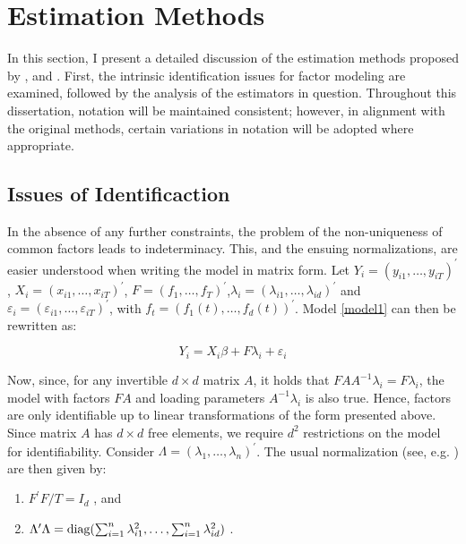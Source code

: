 \section{Estimation Methods}\label{estimation}

In this section, I present a detailed discussion of the estimation methods proposed by \citet{kneip2012new}, \citet{bai2009panel} and \citet{bada2014parameter}. First, the intrinsic identification issues for factor modeling are examined, followed by the analysis of the estimators in question. Throughout this dissertation, notation will be maintained consistent; however, in alignment with the original methods, certain variations in notation will be adopted where appropriate.

\subsection{Issues of Identificaction}\label{identification}

In the absence of any further constraints, the problem of the non-uniqueness of common factors leads to indeterminacy. This, and the ensuing normalizations, are easier understood when writing the model in matrix form. Let $Y_i = (y_{i1}, \ldots, y_{iT})^\prime$, $X_i = (x_{i1}, \ldots, x_{iT})^{\prime}$, $F = (f_1,  \ldots, f_T)^\prime$,$ \lambda_i = (\lambda_{i 1}, \ldots, \lambda_{i d})^{\prime}$ and $\varepsilon_{i} = (\varepsilon_{i1}, \ldots, \varepsilon_{iT})^\prime$, with  $f_t = (f_1(t), \ldots, f_d(t))^\prime$. Model \cref{model1} can then be rewritten as:

\begin{equation}\label{matrix_notation}
    Y_i=X_i \beta+ F\lambda_i +\varepsilon_i
\end{equation}

 

Now, since, for any invertible  $d \times d$ matrix $A$, it holds that $ F A A^{-1} \lambda_i =  F \lambda_i$, the model with factors $FA$ and loading parameters $A^{-1}\lambda_i $ is also true. Hence, factors are only identifiable up to linear transformations of the form presented above. Since matrix $A$ has $d \times d$ free elements, we require $d^2$ restrictions on the model for identifiability. Consider $\Lambda = (\lambda_1, \ldots, \lambda_n)^\prime$. The usual normalization (see, e.g. \citet{bai2008large}) are then given by:   

\begin{enumerate}[label = (\alph*)]
    \item $F^\prime F/T = I_d$ \label{cond_a}, and
    \item $\Lambda^\prime \Lambda = \operatorname{\text{diag}}(\sum_{i=1}^n \lambda_{i1}^2, \ldots, \sum_{i=1}^n \lambda_{id}^2 ) $ \label{cond_b}.
\end{enumerate}


